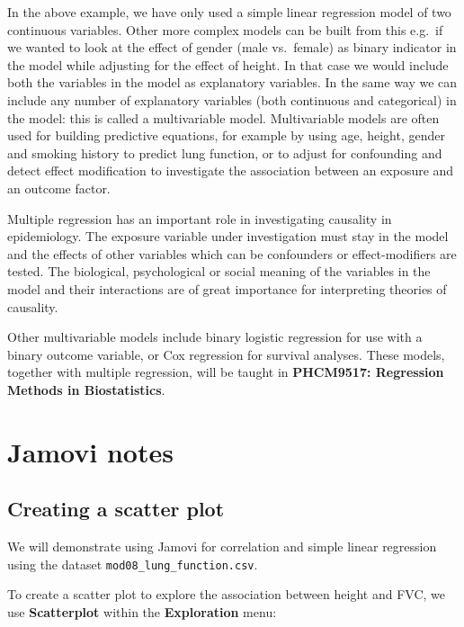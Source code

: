 \documentclass[
  a4paper,
]{memoir}
\begin{document}
In the above example, we have only used a simple linear regression model
of two continuous variables. Other more complex models can be built from
this e.g.~if we wanted to look at the effect of gender (male vs.~female)
as binary indicator in the model while adjusting for the effect of
height. In that case we would include both the variables in the model as
explanatory variables. In the same way we can include any number of
explanatory variables (both continuous and categorical) in the model:
this is called a multivariable model. Multivariable models are often
used for building predictive equations, for example by using age,
height, gender and smoking history to predict lung function, or to
adjust for confounding and detect effect modification to investigate the
association between an exposure and an outcome factor.

Multiple regression has an important role in investigating causality in
epidemiology. The exposure variable under investigation must stay in the
model and the effects of other variables which can be confounders or
effect-modifiers are tested. The biological, psychological or social
meaning of the variables in the model and their interactions are of
great importance for interpreting theories of causality.

Other multivariable models include binary logistic regression for use
with a binary outcome variable, or Cox regression for survival analyses.
These models, together with multiple regression, will be taught in
\textbf{PHCM9517: Regression Methods in Biostatistics}.

\newpage{}


\chapter*{Jamovi notes}\label{jamovi-notes-6}


\section{Creating a scatter plot}\label{creating-a-scatter-plot}

We will demonstrate using Jamovi for correlation and simple linear
regression using the dataset \texttt{mod08\_lung\_function.csv}.

To create a scatter plot to explore the association between height and
FVC, we use \textbf{Scatterplot} within the \textbf{Exploration} menu:
\end{document}
